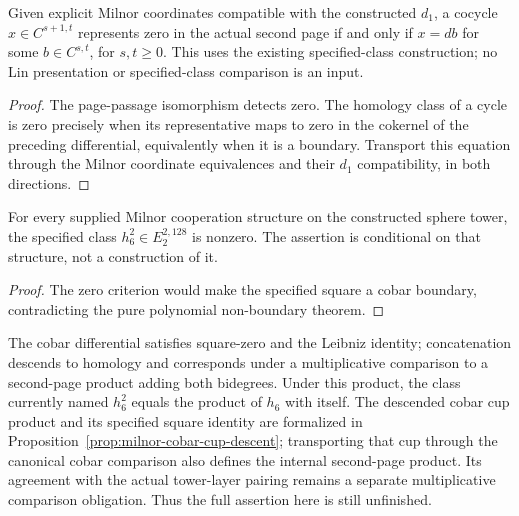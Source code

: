 \begin{proposition}
  \label{prop:h6-standard-class-zero-criterion}
  \leanok
  Given explicit Milnor coordinates compatible with the constructed $d_1$,
  a cocycle $x\in C^{s+1,t}$ represents zero in the actual second page if
  and only if $x=db$ for some $b\in C^{s,t}$, for $s,t\ge0$.
  This uses the existing specified-class construction; no Lin presentation
  or specified-class comparison is an input.
\end{proposition}
\begin{proof}
  The page-passage isomorphism detects zero. The homology class of a cycle
  is zero precisely when its representative maps to zero in the cokernel
  of the preceding differential, equivalently when it is a boundary.
  Transport this equation through the Milnor coordinate equivalences and
  their $d_1$ compatibility, in both directions.
  \leanok
\end{proof}

\begin{proposition}
  \label{prop:h6-standard-square-nonzero}
  \leanok
  For every supplied Milnor cooperation structure on the constructed sphere
  tower, the specified class $h_6^2\in E_2^{2,128}$ is nonzero.
  The assertion is conditional on that structure, not a construction of it.
\end{proposition}
\begin{proof}
  The zero criterion would make the specified square a cobar boundary,
  contradicting the pure polynomial non-boundary theorem.
  \leanok
\end{proof}

\begin{proposition}
  \label{prop:h6-e2-square-identity}
  \notready
  The cobar differential satisfies square-zero and the Leibniz identity;
  concatenation descends to homology and corresponds under a multiplicative
  comparison to a second-page product adding both bidegrees. Under this product,
  the class currently named $h_6^2$ equals the product of $h_6$ with itself.
  The descended cobar cup product and its specified square identity are
  formalized in Proposition~\ref{prop:milnor-cobar-cup-descent}; transporting
  that cup through the canonical cobar comparison also defines the internal
  second-page product. Its agreement with the actual tower-layer pairing
  remains a separate multiplicative comparison obligation. Thus the full
  assertion here is still unfinished.
\end{proposition}

